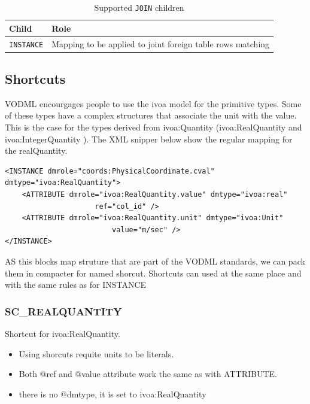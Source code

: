 \documentclass[11pt,a4paper]{ivoa}
\begin{document}
\begin{table}[!htbp]
     \begin{tabular}{|p{4cm}|p{9cm}|}
       \hline Child &  Role\\
       \hline  \texttt{INSTANCE}    & Mapping to be applied to joint foreign table rows matching  \\       
       \hline 
     \end{tabular}
     \caption{Supported  \texttt{JOIN} children} 
     \label{tbl:filter-children}
\end{table}

\subsection{Shortcuts}
VODML encourgages people to use the ivoa model for the primitive types. 
Some of these types have a complex structures that associate the unit with the value. 
This is the case for the types derived from ivoa:Quantity (ivoa:RealQuantity and ivoa:IntegerQuantity ).
The XML snipper below show the regular mapping for the realQuantity.

\begin{lstlisting}[caption={ivoa:RealQuantity example},captionpos=b]
<INSTANCE dmrole="coords:PhysicalCoordinate.cval"
dmtype="ivoa:RealQuantity">
    <ATTRIBUTE dmrole="ivoa:RealQuantity.value" dmtype="ivoa:real"
                     ref="col_id" />
    <ATTRIBUTE dmrole="ivoa:RealQuantity.unit" dmtype="ivoa:Unit"
                         value="m/sec" />
</INSTANCE>
\end{lstlisting}



AS this blocks map struture that are part of the VODML standards, we can pack them in compacter for named shorcut.
Shortcuts can used at the same place and with the same rules as for INSTANCE

\subsubsection{SC\_REALQUANTITY}
Shortcut for ivoa:RealQuantity.

\begin{itemize}
    \item Using shorcuts requite units to be literals.    
    \item Both @ref and @value attribute work the same as with ATTRIBUTE.
    \item there is no @dmtype, it is set to   ivoa:RealQuantity

  \end{itemize}
\end{document}
